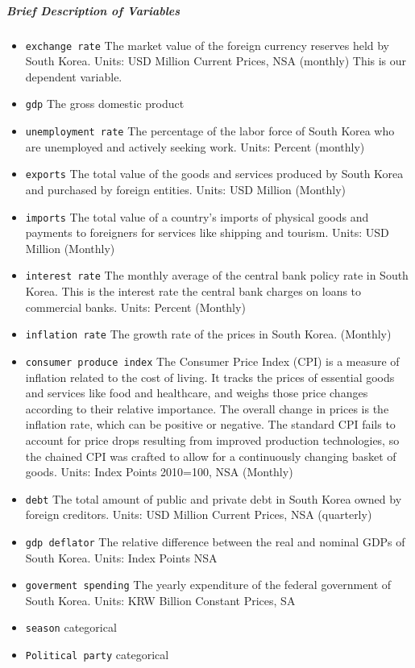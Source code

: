 \documentclass[12pt]{article}
\begin{document}
\subparagraph{Brief Description of Variables}
\begin{itemize}
    \item {\tt exchange rate} The market value of the foreign currency reserves held by South Korea. Units: USD Million Current Prices, NSA (monthly) This is our dependent variable.
    \item {\tt gdp} The gross domestic product
    \item {\tt unemployment rate} The percentage of the labor force of South Korea who are unemployed and actively seeking work. Units: Percent (monthly)
    \item {\tt exports} The total value of the goods and services produced by South Korea and purchased by foreign entities. Units: USD Million (Monthly)
    \item {\tt imports} The total value of a country's imports of physical goods and payments to foreigners for services like shipping and tourism. Units: USD Million (Monthly)
    \item {\tt interest rate} The monthly average of the central bank policy rate in South Korea. This is the interest rate the central bank charges on loans to commercial banks. Units: Percent (Monthly)
    \item {\tt inflation rate} The growth rate of the prices in South Korea. (Monthly)
    \item {\tt consumer produce index} The Consumer Price Index (CPI) is a measure of inflation related to the cost of living. It tracks the prices of essential goods and services like food and healthcare, and weighs those price changes according to their relative importance. The overall change in prices is the inflation rate, which can be positive or negative. The standard CPI fails to account for price drops resulting from improved production technologies, so the chained CPI was crafted to allow for a continuously changing basket of goods. Units: Index Points 2010=100, NSA (Monthly)
    \item {\tt debt} The total amount of public and private debt in South Korea owned by foreign creditors. Units: USD Million Current Prices, NSA (quarterly)
    \item {\tt gdp deflator} The relative difference between the real and nominal GDPs of South Korea. Units: Index Points NSA
    \item {\tt goverment spending} The yearly expenditure of the federal government of South Korea. Units: KRW Billion Constant Prices, SA 
    \item {\tt season} categorical
    \item {\tt Political party}  categorical
\end{itemize}
\end{document}
